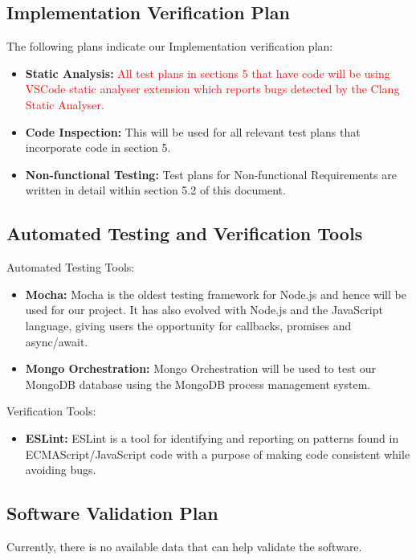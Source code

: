\documentclass[12pt, titlepage]{article}
\begin{document}
\subsection{Implementation Verification Plan}
The following plans indicate our Implementation verification plan:
\begin{itemize}
    \item \textbf{Static Analysis:} \textcolor{red}{ All test plans in sections 5 that have code will be using VSCode static analyser extension which reports bugs detected by the Clang Static Analyser.}
    \item \textbf{Code Inspection:} This will be used for all relevant test plans that incorporate code in section 5.
    \item \textbf{Non-functional Testing:} Test plans for Non-functional Requirements are written in detail within section 5.2 of this document.
\end{itemize}

\subsection{Automated Testing and Verification Tools}
Automated Testing Tools:
\begin{itemize}
    \item \textbf{Mocha:} Mocha is the oldest testing framework for Node.js and hence will be used for our project. It has also evolved with Node.js and the JavaScript language, giving users the opportunity for callbacks, promises and async/await. 
    \item \textbf{Mongo Orchestration:} Mongo Orchestration will be used to test our MongoDB database using the MongoDB process management system.
\end{itemize}
Verification Tools:
\begin{itemize}
    \item \textbf{ESLint:} ESLint is a tool for identifying and reporting on patterns found in ECMAScript/JavaScript code with a purpose of making code consistent while avoiding bugs.
\end{itemize}

\subsection{Software Validation Plan}

Currently, there is no available data that can help validate the software.
\end{document}
